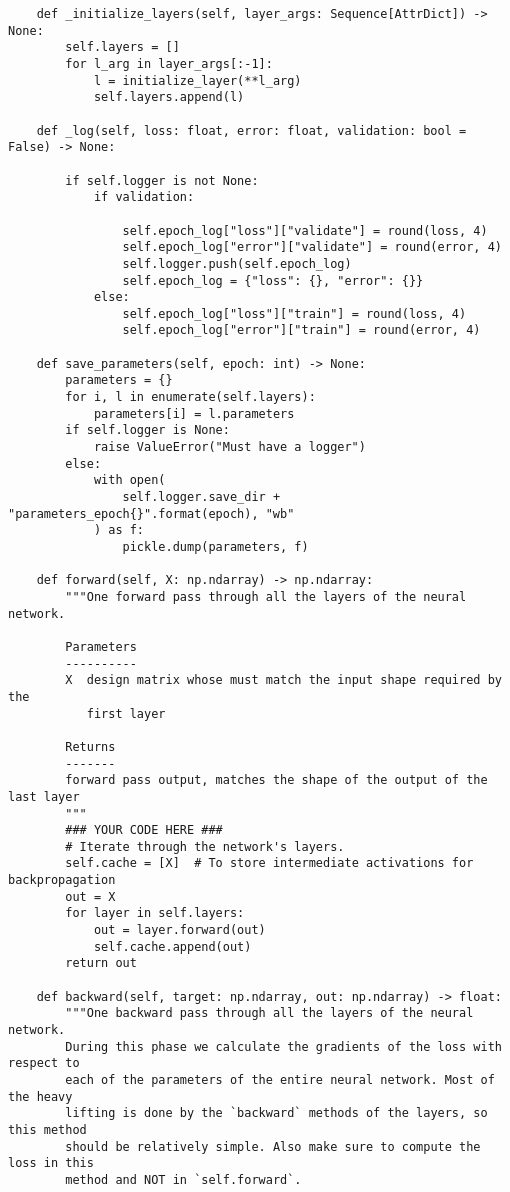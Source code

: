 \documentclass{article}
\begin{document}
\begin{enumerate}
\begin{verbatim}
    def _initialize_layers(self, layer_args: Sequence[AttrDict]) -> None:
        self.layers = []
        for l_arg in layer_args[:-1]:
            l = initialize_layer(**l_arg)
            self.layers.append(l)

    def _log(self, loss: float, error: float, validation: bool = False) -> None:

        if self.logger is not None:
            if validation:

                self.epoch_log["loss"]["validate"] = round(loss, 4)
                self.epoch_log["error"]["validate"] = round(error, 4)
                self.logger.push(self.epoch_log)
                self.epoch_log = {"loss": {}, "error": {}}
            else:
                self.epoch_log["loss"]["train"] = round(loss, 4)
                self.epoch_log["error"]["train"] = round(error, 4)

    def save_parameters(self, epoch: int) -> None:
        parameters = {}
        for i, l in enumerate(self.layers):
            parameters[i] = l.parameters
        if self.logger is None:
            raise ValueError("Must have a logger")
        else:
            with open(
                self.logger.save_dir + "parameters_epoch{}".format(epoch), "wb"
            ) as f:
                pickle.dump(parameters, f)

    def forward(self, X: np.ndarray) -> np.ndarray:
        """One forward pass through all the layers of the neural network.

        Parameters
        ----------
        X  design matrix whose must match the input shape required by the
           first layer

        Returns
        -------
        forward pass output, matches the shape of the output of the last layer
        """
        ### YOUR CODE HERE ###
        # Iterate through the network's layers.
        self.cache = [X]  # To store intermediate activations for backpropagation
        out = X
        for layer in self.layers:
            out = layer.forward(out)
            self.cache.append(out)
        return out

    def backward(self, target: np.ndarray, out: np.ndarray) -> float:
        """One backward pass through all the layers of the neural network.
        During this phase we calculate the gradients of the loss with respect to
        each of the parameters of the entire neural network. Most of the heavy
        lifting is done by the `backward` methods of the layers, so this method
        should be relatively simple. Also make sure to compute the loss in this
        method and NOT in `self.forward`.


\end{verbatim}
\end{enumerate}
\end{document}
